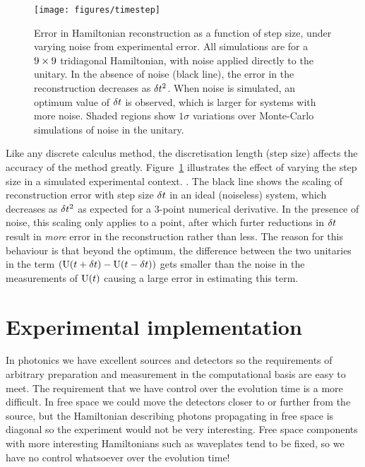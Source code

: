 \begin{figure}[h]
  \centering
  \texttt{[image: figures/timestep]}
  \caption[Error in Hamiltonian reconstruction as a function of step size]
  {Error in Hamiltonian reconstruction as a function of step size, under varying
  noise from experimental error. All simulations are for a \(9 \times 9\)
  tridiagonal Hamiltonian, with noise applied directly to the unitary.
  In the absence of noise (black line), the error in the
  reconstruction decreases as \(\delta t^{2}\). When noise is simulated, an optimum
  value of \(\delta t\) is observed, which is larger for systems with more noise.
  Shaded regions show \(1 \sigma\) variations over Monte-Carlo simulations of
  noise in the unitary.}
  \label{fig:stepsize}
\end{figure}

Like any discrete calculus method, the discretisation length (step size) affects
the accuracy of the method greatly. Figure~\ref{fig:stepsize} illustrates the
effect of varying the step size in a simulated experimental context.
. The black line shows the
scaling of reconstruction error with step size \(\delta t\) in an ideal (noiseless)
system, which decreases as \(\delta t^{2}\) as expected for a 3-point numerical
derivative. In the presence of noise, this scaling only applies to a point,
after which furter reductions in \(\delta t\) result in \emph{more} error in the
reconstruction rather than less. The reason for this behaviour is that beyond
the optimum, the difference between the two unitaries in the term \(\left(
\mathrm{U} \!\left(t+\delta t\right) - \mathrm{U} \!\left(t-\delta t\right) \right)\) gets smaller than the noise
in the measurements of \(\mathrm{U} \!\left(t\right)\) causing a large error in estimating
this term.

\section{Experimental implementation}
\label{sec:HTExperiment}
In photonics we have excellent sources \cite{sources-kwiat,
sources-josh} and detectors \cite{detectors-yale, detectors-sprengers} so the
requirements of arbitrary preparation and measurement in the computational basis
are easy to meet. The requirement that we have control over the evolution time
is a more difficult. In free space we could move the detectors closer to or
further from the source, but the Hamiltonian describing photons propagating in
free space is diagonal so the experiment would not be very interesting. Free
space components with more interesting Hamiltonians such as waveplates tend to
be fixed, so we have no control whatsoever over the evolution time!

